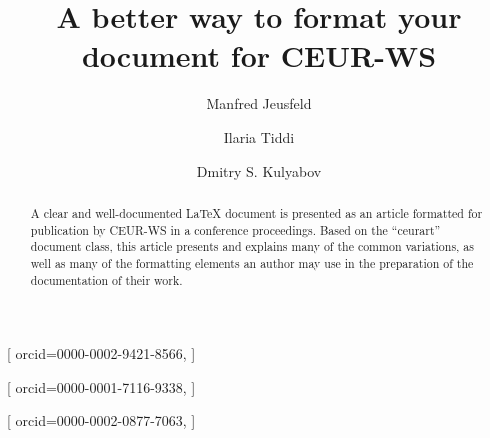 \documentclass[
]{ceurart}
\begin{document}



\title{A better way to format your document for CEUR-WS}


\author[1]{Manfred Jeusfeld}[%
orcid=0000-0002-9421-8566,
]

\address[1]{University of Skövde, Högskolevägen 1, 541 28 Skövde, Sweden}


\author[2]{Ilaria Tiddi}[%
orcid=0000-0001-7116-9338,
]

\address[2]{Vrije Universiteit Amsterdam, De Boelelaan 1105, 1081 HV Amsterdam, The Netherlands}


\author[3,4]{Dmitry S. Kulyabov}[%
orcid=0000-0002-0877-7063,
]


\address[3]{Peoples' Friendship University of Russia (RUDN University),
  6 Miklukho-Maklaya St, Moscow, 117198, Russian Federation}

\address[4]{Joint Institute for Nuclear Research,
  6 Joliot-Curie, Dubna, Moscow region, 141980, Russian Federation}

\begin{abstract}
  A clear and well-documented \LaTeX{} document is presented as an
  article formatted for publication by CEUR-WS in a conference
  proceedings. Based on the ``ceurart'' document class, this article
  presents and explains many of the common variations, as well as many
  of the formatting elements an author may use in the preparation of
  the documentation of their work.
\end{abstract}
\end{document}
